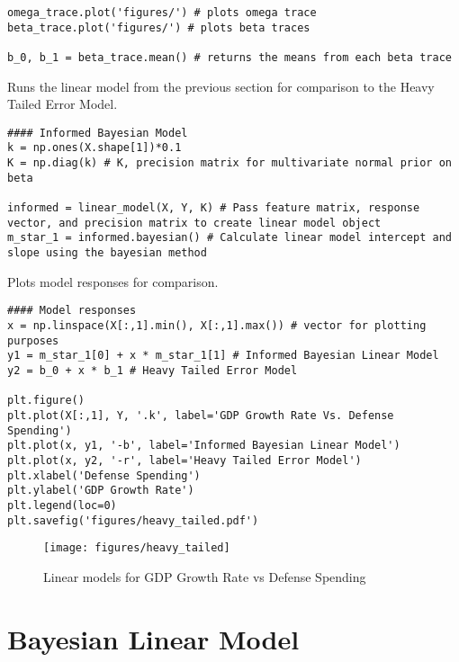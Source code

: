 \documentclass[10pt]{article}
\begin{document}
\begin{enumerate}[label=(\Alph*)]
\begin{lstlisting}
omega_trace.plot('figures/') # plots omega trace
beta_trace.plot('figures/') # plots beta traces

b_0, b_1 = beta_trace.mean() # returns the means from each beta trace
        \end{lstlisting}

        Runs the linear model from the previous section for comparison to the Heavy Tailed Error Model. 

        \begin{lstlisting}
#### Informed Bayesian Model
k = np.ones(X.shape[1])*0.1
K = np.diag(k) # K, precision matrix for multivariate normal prior on beta

informed = linear_model(X, Y, K) # Pass feature matrix, response vector, and precision matrix to create linear model object
m_star_1 = informed.bayesian() # Calculate linear model intercept and slope using the bayesian method
        \end{lstlisting}

        Plots model responses for comparison.

        \begin{lstlisting}
#### Model responses
x = np.linspace(X[:,1].min(), X[:,1].max()) # vector for plotting purposes
y1 = m_star_1[0] + x * m_star_1[1] # Informed Bayesian Linear Model
y2 = b_0 + x * b_1 # Heavy Tailed Error Model

plt.figure()
plt.plot(X[:,1], Y, '.k', label='GDP Growth Rate Vs. Defense Spending')
plt.plot(x, y1, '-b', label='Informed Bayesian Linear Model')
plt.plot(x, y2, '-r', label='Heavy Tailed Error Model')
plt.xlabel('Defense Spending')
plt.ylabel('GDP Growth Rate')
plt.legend(loc=0)
plt.savefig('figures/heavy_tailed.pdf')
        \end{lstlisting}

      \begin{figure}[ht] 
        \centering 
        \texttt{[image: figures/heavy\_tailed]}
        \caption{\label{fig:heavy_tailed}Linear models for GDP Growth Rate vs Defense Spending}
      \end{figure}

    \end{enumerate}

  \clearpage
  \appendix
  \section{Bayesian Linear Model}
\end{document}
